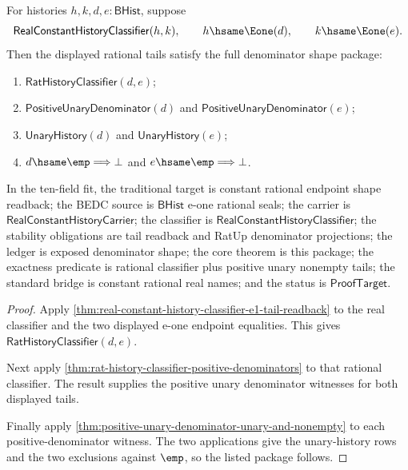 \begin{theorem}
\label{thm:real-constant-history-classifier-e1-denominator-package}
For histories $h,k,d,e:\mathsf{BHist}$, suppose
$$
\mathsf{RealConstantHistoryClassifier}(h,k),\qquad
h\hsame\Eone(d),\qquad
k\hsame\Eone(e).
$$
Then the displayed rational tails satisfy the full denominator shape package:
\begin{enumerate}
  \item $\mathsf{RatHistoryClassifier}(d,e)$;
  \item $\mathsf{PositiveUnaryDenominator}(d)$ and
  $\mathsf{PositiveUnaryDenominator}(e)$;
  \item $\mathsf{UnaryHistory}(d)$ and $\mathsf{UnaryHistory}(e)$;
  \item $d\hsame\emp\Longrightarrow\bot$ and
  $e\hsame\emp\Longrightarrow\bot$.
\end{enumerate}
In the ten-field fit, the traditional target is constant rational endpoint
shape readback; the BEDC source is $\mathsf{BHist}$ e-one rational seals; the
carrier is $\mathsf{RealConstantHistoryCarrier}$; the classifier is
$\mathsf{RealConstantHistoryClassifier}$; the stability obligations are tail
readback and RatUp denominator projections; the ledger is exposed denominator
shape; the core theorem is this package; the exactness predicate is rational
classifier plus positive unary nonempty tails; the standard bridge is constant
rational real names; and the status is $\mathsf{ProofTarget}$.
\end{theorem}
\begin{proof}
Apply \autoref{thm:real-constant-history-classifier-e1-tail-readback} to the
real classifier and the two displayed e-one endpoint equalities. This gives
$\mathsf{RatHistoryClassifier}(d,e)$.

Next apply \autoref{thm:rat-history-classifier-positive-denominators} to that
rational classifier. The result supplies the positive unary denominator
witnesses for both displayed tails.

Finally apply \autoref{thm:positive-unary-denominator-unary-and-nonempty} to
each positive-denominator witness. The two applications give the unary-history
rows and the two exclusions against $\emp$, so the listed package follows.
\end{proof}

